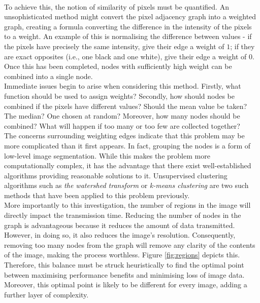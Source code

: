 \smallskip \\ \indent
To achieve this, the notion of similarity of pixels must be quantified. An unsophisticated method might convert the pixel adjacency graph into a weighted graph, creating a formula converting the difference in the intensity of the pixels to a weight. An example of this is normalising the difference between values - if the pixels have precisely the same intensity, give their edge a weight of $1$; if they are exact opposites (i.e., one black and one white), give their edge a weight of $0$. Once this has been completed, nodes with sufficiently high weight can be combined into a single node. 
\smallskip \\ \indent
Immediate issues begin to arise when considering this method. Firstly, what function should be used to assign weights? Secondly, how should nodes be combined if the pixels have different values? Should the mean value be taken? The median? One chosen at random? Moreover, how many nodes should be combined? What will happen if too many or too few are collected together?
\smallskip \\ \indent
The concerns surrounding weighting edges indicate that this problem may be more complicated than it first appears. In fact, grouping the nodes is a form of low-level image segmentation. While this makes the problem more computationally complex, it has the advantage that there exist well-established algorithms providing reasonable solutions to it. Unsupervised clustering algorithms such as \textit{the watershed transform} \cite{Watershed} or \textit{k-means clustering} \cite{KMeans} are two such methods that have been applied to this problem previously.
\smallskip \\ \indent
More importantly to this investigation, the number of regions in the image will directly impact the transmission time. Reducing the number of nodes in the graph is advantageous because it reduces the amount of data transmitted. However, in doing so, it also reduces the image's resolution. Consequently, removing too many nodes from the graph will remove any clarity of the contents of the image, making the process worthless. Figure \ref{fig:regions} depicts this. Therefore, this balance must be struck heuristically to find the optimal point between maximising performance benefits and minimising loss of image data. Moreover, this optimal point is likely to be different for every image, adding a further layer of complexity.
